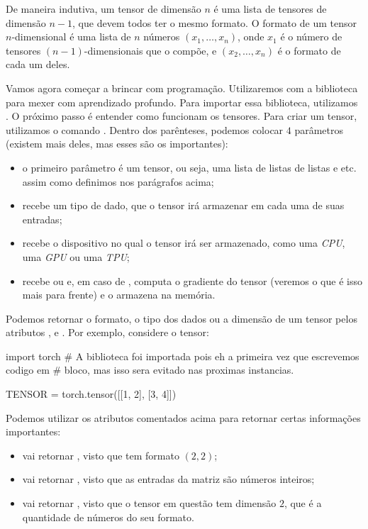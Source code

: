 \documentclass{article}
\begin{document}
De maneira indutiva, um tensor de dimensão $n$ é uma lista de tensores de dimensão $n-1$, que devem todos ter o mesmo formato. O formato de um tensor $n$-dimensional é uma lista de $n$ números $(x_1, \dots, x_n)$, onde $x_1$ é o número de tensores $(n-1)$-dimensionais que o compõe, e $(x_2, \dots, x_n)$ é o formato de cada um deles.

Vamos agora começar a brincar com programação. Utilizaremos  com a biblioteca  para mexer com aprendizado profundo. Para importar essa biblioteca, utilizamos . O próximo passo é entender como funcionam os tensores. Para criar um tensor, utilizamos o comando . Dentro dos parênteses, podemos colocar $4$ parâmetros (existem mais deles, mas esses são os importantes): \begin{itemize}
    \item o primeiro parâmetro é um tensor, ou seja, uma lista de listas de listas e etc. assim como definimos nos parágrafos acima;
    \item {} recebe um tipo de dado, que o tensor irá armazenar em cada uma de suas entradas;
    \item {} recebe o dispositivo no qual o tensor irá ser armazenado, como uma \textit{CPU}, uma \textit{GPU} ou uma \textit{TPU};
    \item {} recebe  ou  e, em caso de , computa o gradiente do tensor (veremos o que é isso mais para frente) e o armazena na memória.
\end{itemize}

Podemos retornar o formato, o tipo dos dados ou a dimensão de um tensor pelos atributos ,  e . Por exemplo, considere o tensor: \begin{python}
import torch # A biblioteca foi importada pois eh a primeira vez que escrevemos codigo em
# bloco, mas isso sera evitado nas proximas instancias.

TENSOR = torch.tensor([[1, 2],
                       [3, 4]])
\end{python}
Podemos utilizar os atributos comentados acima para retornar certas informações importantes: \begin{itemize}
    \item {} vai retornar , visto que  tem formato $(2,2)$;
    \item {} vai retornar , visto que as entradas da matriz são números inteiros;
    \item {} vai retornar , visto que o tensor em questão tem dimensão $2$, que é a quantidade de números do seu formato.
\end{itemize}
\end{document}
